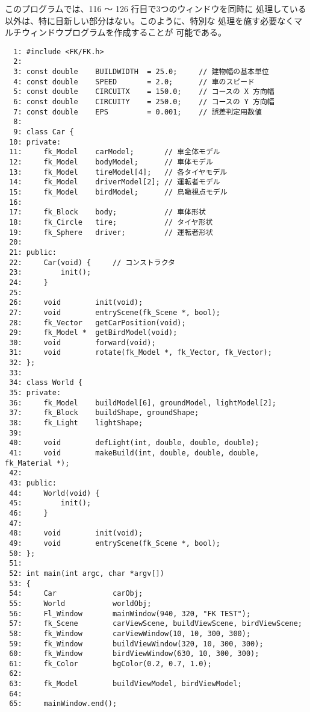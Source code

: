 このプログラムでは、116 〜 126 行目で3つのウィンドウを同時に
処理している以外は、特に目新しい部分はない。このように、特別な
処理を施す必要なくマルチウィンドウプログラムを作成することが
可能である。
\\
\begin{breakbox}
\begin{verbatim}
  1: #include <FK/FK.h>
  2: 
  3: const double    BUILDWIDTH  = 25.0;     // 建物幅の基本単位
  4: const double    SPEED       = 2.0;      // 車のスピード
  5: const double    CIRCUITX    = 150.0;    // コースの X 方向幅
  6: const double    CIRCUITY    = 250.0;    // コースの Y 方向幅
  7: const double    EPS         = 0.001;    // 誤差判定用数値
  8: 
  9: class Car {
 10: private:
 11:     fk_Model    carModel;       // 車全体モデル
 12:     fk_Model    bodyModel;      // 車体モデル
 13:     fk_Model    tireModel[4];   // 各タイヤモデル
 14:     fk_Model    driverModel[2]; // 運転者モデル
 15:     fk_Model    birdModel;      // 鳥瞰視点モデル
 16: 
 17:     fk_Block    body;           // 車体形状
 18:     fk_Circle   tire;           // タイヤ形状
 19:     fk_Sphere   driver;         // 運転者形状
 20: 
 21: public:
 22:     Car(void) {     // コンストラクタ
 23:         init();
 24:     }
 25: 
 26:     void        init(void);
 27:     void        entryScene(fk_Scene *, bool);   
 28:     fk_Vector   getCarPosition(void);
 29:     fk_Model *  getBirdModel(void);
 30:     void        forward(void);
 31:     void        rotate(fk_Model *, fk_Vector, fk_Vector);
 32: };
 33: 
 34: class World {
 35: private:
 36:     fk_Model    buildModel[6], groundModel, lightModel[2];
 37:     fk_Block    buildShape, groundShape;
 38:     fk_Light    lightShape;
 39: 
 40:     void        defLight(int, double, double, double);
 41:     void        makeBuild(int, double, double, double, fk_Material *);
 42: 
 43: public:
 44:     World(void) {
 45:         init();
 46:     }
 47: 
 48:     void        init(void);
 49:     void        entryScene(fk_Scene *, bool);
 50: };
 51: 
 52: int main(int argc, char *argv[])
 53: {
 54:     Car             carObj;
 55:     World           worldObj;
 56:     Fl_Window       mainWindow(940, 320, "FK TEST");
 57:     fk_Scene        carViewScene, buildViewScene, birdViewScene;
 58:     fk_Window       carViewWindow(10, 10, 300, 300);
 59:     fk_Window       buildViewWindow(320, 10, 300, 300);
 60:     fk_Window       birdViewWindow(630, 10, 300, 300);
 61:     fk_Color        bgColor(0.2, 0.7, 1.0);
 62: 
 63:     fk_Model        buildViewModel, birdViewModel;
 64: 
 65:     mainWindow.end();

\end{verbatim}
\end{breakbox}
